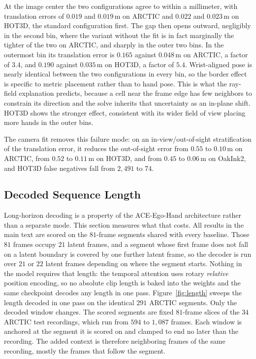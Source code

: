 \documentclass[10pt,twocolumn,letterpaper]{article}
\newcommand{\method}{ACE-Ego-Hand} %
\begin{document}
At the image center the two configurations agree to within a millimeter, with translation errors of $0.019$ and $0.019$\,m on ARCTIC and $0.022$ and $0.023$\,m on HOT3D, the standard configuration first. The gap then opens outward, negligibly in the second bin, where the variant without the fit is in fact marginally the tighter of the two on ARCTIC, and sharply in the outer two bins. In the outermost bin its translation error is $0.165$ against $0.048$\,m on ARCTIC, a factor of $3.4$, and $0.190$ against $0.035$\,m on HOT3D, a factor of $5.4$. Wrist-aligned pose is nearly identical between the two configurations in every bin, so the border effect is specific to metric placement rather than to hand pose. This is what the ray-field explanation predicts, because a cell near the frame edge has few neighbors to constrain its direction and the solve inherits that uncertainty as an in-plane shift. HOT3D shows the stronger effect, consistent with its wider field of view placing more hands in the outer bins.

The camera fit removes this failure mode: on an in-view/out-of-sight stratification of the translation error, it reduces the out-of-sight error from $0.55$ to $0.10$\,m on ARCTIC, from $0.52$ to $0.11$\,m on HOT3D, and from $0.45$ to $0.06$\,m on OakInk2, and HOT3D false negatives fall from $2{,}491$ to $74$.

\subsection{Decoded Sequence Length}
Long-horizon decoding is a property of the \method{} architecture rather than a separate mode. This section measures what that costs. All results in the main text are scored on the $81$-frame segments shared with every baseline. Those $81$ frames occupy $21$ latent frames, and a segment whose first frame does not fall on a latent boundary is covered by one further latent frame, so the decoder is run over $21$ or $22$ latent frames depending on where the segment starts. Nothing in the model requires that length: the temporal attention uses rotary \emph{relative} position encoding, so no absolute clip length is baked into the weights and the same checkpoint decodes any length in one pass. Figure~\ref{fig:length} sweeps the length decoded in one pass on the identical $291$ ARCTIC segments. Only the decoded window changes. The scored segments are fixed $81$-frame slices of the $34$ ARCTIC test recordings, which run from $594$ to $1{,}087$ frames. Each window is anchored at the segment it is scored on and clamped to end no later than the recording. The added context is therefore neighboring frames of the same recording, mostly the frames that follow the segment.
\end{document}

